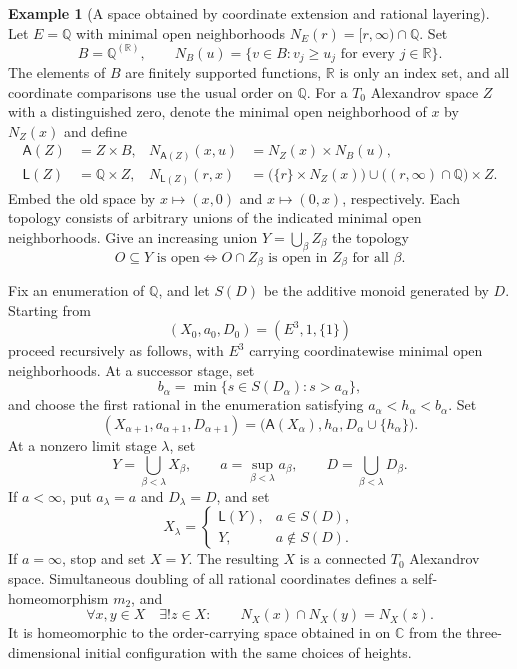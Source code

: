 \documentclass[10pt,letterpaper]{amsart}
\numberwithin{equation}{section}
\theoremstyle{definition}
\newtheorem{exmp}[thm]{Example}
\newcommand{\Q}{\mathbb Q}
\newcommand{\C}{\mathbb C}
\begin{document}
\begin{exmp}[A space obtained by coordinate extension and rational layering]\label{ex:lattice-space}
Let $E=\Q$ with minimal open neighborhoods $N_E(r)=[r,\infty)\cap\Q$. Set
\[
B=\Q^{(\mathbb R)},\qquad
N_B(u)=\{v\in B:v_j\ge u_j\text{ for every }j\in\mathbb R\}.
\]
The elements of $B$ are finitely supported functions, $\mathbb R$ is only an index set, and all coordinate comparisons use the usual order on $\Q$.
For a $T_0$ Alexandrov space $Z$ with a distinguished zero, denote the minimal open neighborhood of $x$ by $N_Z(x)$ and define
\begin{align*}
\mathsf A(Z)&=Z\times B,&
N_{\mathsf A(Z)}(x,u)&=N_Z(x)\times N_B(u),\\
\mathsf L(Z)&=\Q\times Z,&
N_{\mathsf L(Z)}(r,x)&=\bigl(\{r\}\times N_Z(x)\bigr)
\cup\bigl((r,\infty)\cap\Q\bigr)\times Z.
\end{align*}
Embed the old space by $x\mapsto(x,0)$ and $x\mapsto(0,x)$, respectively. Each topology consists of arbitrary unions of the indicated minimal open neighborhoods. Give an increasing union $Y=\bigcup_\beta Z_\beta$ the topology
\[
O\subseteq Y\text{ is open}\iff O\cap Z_\beta\text{ is open in }Z_\beta\text{ for all }\beta.
\]

Fix an enumeration of $\Q$, and let $S(D)$ be the additive monoid generated by $D$. Starting from
\[
(X_0,a_0,D_0)=(E^3,1,\{1\})
\]
proceed recursively as follows, with $E^3$ carrying coordinatewise minimal open neighborhoods.
At a successor stage, set
\[
b_\alpha=\min\{s\in S(D_\alpha):s>a_\alpha\},
\]
and choose the first rational in the enumeration satisfying $a_\alpha<h_\alpha<b_\alpha$. Set
\[
(X_{\alpha+1},a_{\alpha+1},D_{\alpha+1})
=\bigl(\mathsf A(X_\alpha),h_\alpha,D_\alpha\cup\{h_\alpha\}\bigr).
\]
At a nonzero limit stage $\lambda$, set
\[
Y=\bigcup_{\beta<\lambda}X_\beta,\qquad
a=\sup_{\beta<\lambda}a_\beta,\qquad
D=\bigcup_{\beta<\lambda}D_\beta.
\]
If $a<\infty$, put $a_\lambda=a$ and $D_\lambda=D$, and set
\[
X_\lambda=
\begin{cases}
\mathsf L(Y),&a\in S(D),\\
Y,&a\notin S(D).
\end{cases}
\]
If $a=\infty$, stop and set $X=Y$.
The resulting $X$ is a connected $T_0$ Alexandrov space. Simultaneous doubling of all rational coordinates defines a self-homeomorphism $m_2$, and
\[
\forall x,y\in X\quad\exists!z\in X:\qquad N_X(x)\cap N_X(y)=N_X(z).
\]
It is homeomorphic to the order-carrying space obtained in \cite[\S5--6]{BY} on $\C$ from the three-dimensional initial configuration with the same choices of heights.
\end{exmp}
\end{document}

